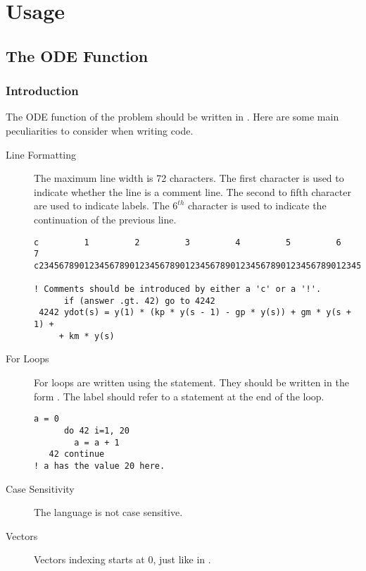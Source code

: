 \chapter[Usage]{Usage}
\section[ODE Function]{The ODE Function}
\subsection{Introduction}
The ODE function of the problem should be written in . Here are some main \Fortran peculiarities to consider when writing \Fortran code.
\begin{description}
 \item[Line Formatting] The maximum line width is 72 characters. The first character is used to indicate whether the line is a comment line. The second to fifth character are used to indicate labels. The $6^{th}$ character is used to indicate the continuation of the previous line.
 \begin{lstlisting}[style=fortrancode,caption=Syntax Example]
c         1         2         3         4         5         6         7
c23456789012345678901234567890123456789012345678901234567890123456789012

! Comments should be introduced by either a 'c' or a '!'.
      if (answer .gt. 42) go to 4242
 4242 ydot(s) = y(1) * (kp * y(s - 1) - gp * y(s)) + gm * y(s + 1) +
     + km * y(s)
 \end{lstlisting}
 \item[For Loops] For loops are written using the  statement. They should be written in the form . The label should refer to a  statement at the end of the loop.
  \begin{lstlisting}[style=fortrancode,caption=Do-Loop]
      a = 0
      do 42 i=1, 20
        a = a + 1
   42 continue
! a has the value 20 here.
 \end{lstlisting}
 \item[Case Sensitivity] The \Fortran language is not case sensitive.
 \item[Vectors] Vectors indexing starts at 0, just like in \MATLAB.
\end{description}

